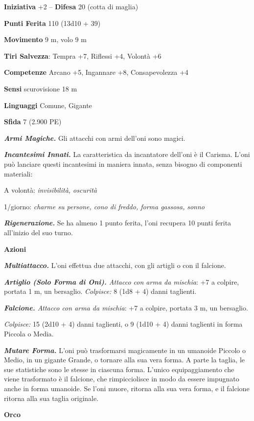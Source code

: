 \begin{multicols}{2}
\textbf{Iniziativa} +2 -- \textbf{Difesa} 20 (cotta di maglia)

\textbf{Punti Ferita} 110 (13d10 + 39)

\textbf{Movimento} 9 m, volo 9 m

\textbf{Tiri Salvezza}: Tempra +7, Riflessi +4, Volontà +6

\textbf{Competenze} Arcano +5, Ingannare +8, Consapevolezza +4 

\textbf{Sensi} scurovisione 18 m 

\textbf{Linguaggi} Comune, Gigante

\textbf{Sfida} 7 (2.900 PE)

\emph{\textbf{Armi Magiche.}} Gli attacchi con armi dell'oni sono magici.

\emph{\textbf{Incantesimi Innati.}} La caratteristica da incantatore dell'oni è il Carisma. L'oni può lanciare questi incantesimi in maniera innata, senza bisogno di componenti materiali:

A volontà: \emph{invisibilità, oscurità}

1/giorno: \emph{charme su persone, cono di freddo, forma gassosa,}
\emph{sonno}

\emph{\textbf{Rigenerazione.}} Se ha almeno 1 punto ferita, l'oni recupera 10 punti ferita all'inizio del suo turno.

\textbf{Azioni}

\emph{\textbf{Multiattacco.}} L'oni effettua due attacchi, con gli artigli o con il falcione.

\emph{\textbf{Artiglio (Solo Forma di Oni).} Attacco con arma da mischia}: +7 a colpire, portata 1 m, un bersaglio. \emph{Colpisce:} 8 (1d8 + 4) danni taglienti.

\emph{\textbf{Falcione.} Attacco con arma da mischia}: +7 a colpire, portata 3 m, un bersaglio.

\emph{Colpisce:} 15 (2d10 + 4) danni taglienti, o 9 (1d10 + 4) danni taglienti in forma Piccola o Media.

\emph{\textbf{Mutare Forma.}} L'oni può trasformarsi magicamente in un umanoide Piccolo o Medio, in un gigante Grande, o tornare alla sua vera forma. A parte la taglia, le sue statistiche sono le stesse in ciascuna forma. L'unico equipaggiamento che viene trasformato è il falcione, che rimpicciolisce in modo da essere impugnato anche in forma umanoide. Se l'oni muore, ritorna alla sua vera forma, e il falcione ritorna alla sua taglia originale.

\medskip{}\textbf{Orco}


\end{multicols}

